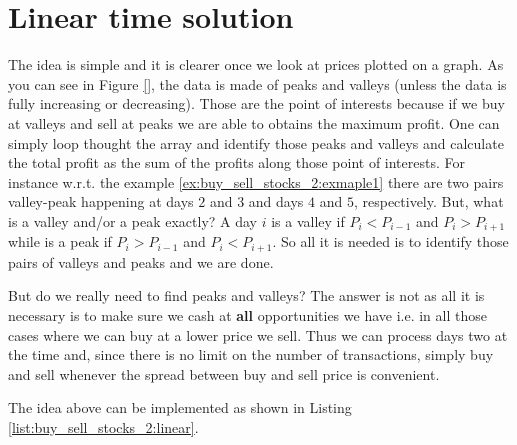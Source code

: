 

\section{Linear time solution}
\label{buy_sell_stocks_2:sec:linear}


The idea is simple and it is clearer once we look at prices plotted on a graph. As you can see in Figure \ref{}, the data is made of peaks and valleys (unless the data is fully increasing or decreasing). Those are the point of interests because if we buy at valleys and sell at peaks we are able to obtains the maximum profit. 
One can simply loop thought the array and identify those peaks and valleys and calculate the total profit as the sum of the profits along those point of interests. 
For instance w.r.t. the example \ref{ex:buy_sell_stocks_2:exmaple1} there are two pairs  valley-peak happening at days $2$ and $3$ and days $4$ and $5$, respectively. 
But, what is a valley and/or a peak exactly?
A day $i$ is a valley if $P_i < P_{i-1}$ and $P_i > P_{i+1}$
while is a peak if $P_i > P_{i-1}$ and $P_i < P_{i+1}$.
So all it is needed is to identify those pairs of valleys and peaks and we are done. 

But do we really need to find peaks and valleys? The answer is not as all it is necessary is to make sure we cash at \textbf{all} opportunities we have i.e. in all those cases where we can buy at a lower price we sell. Thus we can process days two at the time and, since there is no limit on the number of transactions, simply buy and sell whenever the spread between buy and sell price is convenient. 

The idea above can be implemented as shown in Listing \ref{list:buy_sell_stocks_2:linear}. 



